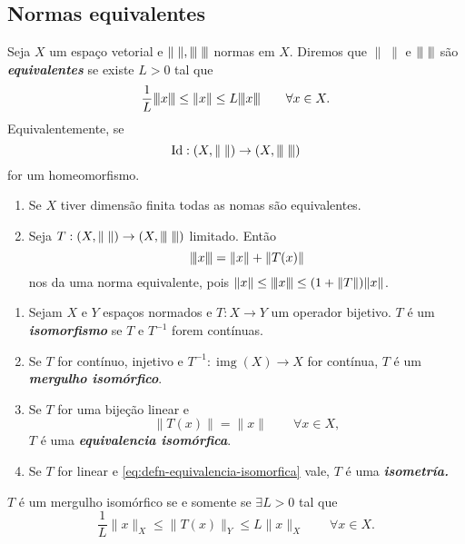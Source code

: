 \documentclass[portuguese]{article}
\theoremstyle{definition}
\DeclareMathOperator{\img}{img}
\DeclareMathOperator{\Id}{Id}
\newcommand{\vertiii}[1]{{\left\vert\kern-0.25ex\left\vert\kern-0.25ex\left\vert #1 
		\right\vert\kern-0.25ex\right\vert\kern-0.25ex\right\vert}}
\begin{document}
	\subsection{Normas equivalentes}
	\begin{defn}
		Seja $X$ um espaço vetorial e $\|\;\|,\vertiii{\;}$ normas em $X$. Diremos que $\|\;\|$ e $\vertiii{\;}$ são \textbf{\textit{equivalentes}} se existe $L>0$ tal que
		\[\frac{1}{L}\vertiii{x}\leq \| x\|\leq L\vertiii{x}\qquad\forall x\in X.\]
		Equivalentemente, se 
		\[\Id:(X,\|\;\|)\to(X,\vertiii{\;})\]
		for um homeomorfismo.
	\end{defn}
	\begin{obs}\leavevmode
		\begin{enumerate}
			\item Se $X$ tiver dimensão finita todas as nomas são equivalentes.
			\item Seja $T:(X,\|\;\|)\to (X,\vertiii{\;})$ limitado. Então
			\[\vertiii{x}=\| x\|+\| T(x)\|\]
			nos da uma norma equivalente, pois $\| x\|\leq\vertiii{x}\leq(1+\| T\|)\| x\|$.
		\end{enumerate}
	\end{obs}
	\begin{defn}\leavevmode
		\begin{enumerate}
			\item Sejam $X$ e $Y$ espaços normados e $T:X\to Y$ um operador bijetivo. $T$ é um \textbf{\textit{isomorfismo}} se $T$ e $T^{-1}$ forem contínuas.
			
			\item Se $T$ for contínuo, injetivo e $T^{-1}:\img(X)\to X$ for contínua, $T$ é um \textbf{\textit{mergulho isomórfico}}.
			
			\item Se $T$ for uma bijeção linear e 
			\begin{equation}\label{eq:defn-equivalencia-isomorfica}
				\| T(x)\|=\| x\|\qquad\forall x\in X,
			\end{equation} 
			$T$ é uma \textbf{\textit{equivalencia isomórfica}}.
			
			\item Se $T$ for linear e \cref{eq:defn-equivalencia-isomorfica} vale, $T$ é uma \textbf{\textit{isometría.}}
		\end{enumerate}
	\end{defn}
	\begin{obs}
		$T$ é um mergulho isomórfico se e somente se $\exists L>0$ tal que 
		\[\frac{1}{L}\| x\|_X\leq\| T(x)\|_Y\leq L\| x\|_X\qquad\forall x\in X.\]
	\end{obs}
	
\end{document}
